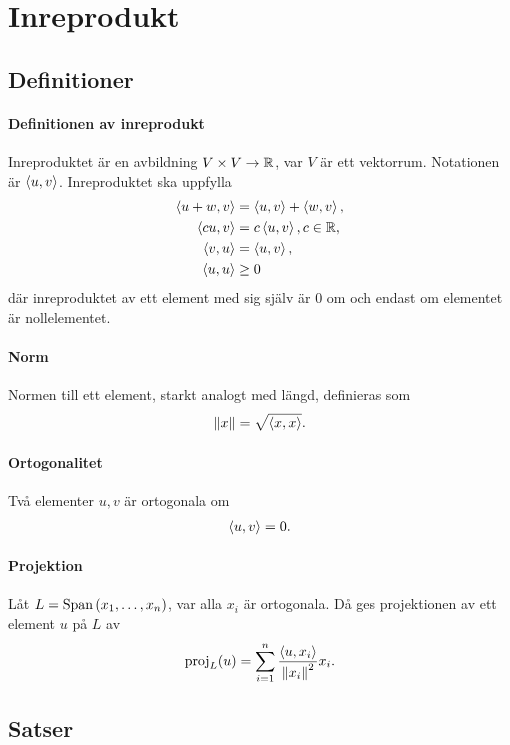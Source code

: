 \section{Inreprodukt}

\subsection{Definitioner}

\paragraph{Definitionen av inreprodukt}
Inreproduktet är en avbildning $V\times V\to\mathbb{R}$, var $V$ är ett vektorrum. Notationen är $\expval{u, v}$. Inreproduktet ska uppfylla
\begin{align*}
	\expval{u + w, v} &= \expval{u, v} + \expval{w, v}, \\
	\expval{cu, v}    &= c\expval{u, v}, c\in\mathbb{R}, \\
	\expval{v, u}     &= \expval{u, v}, \\
	\expval{u, u}     &\geq 0
\end{align*}
där inreproduktet av ett element med sig själv är $0$ om och endast om elementet är nollelementet.

\paragraph{Norm}
Normen till ett element, starkt analogt med längd, definieras som
\begin{align*}
	\norm{x} = \sqrt{\expval{x, x}}.
\end{align*}

\paragraph{Ortogonalitet}
Två elementer $u, v$ är ortogonala om
\begin{align*}
	\expval{u, v} = 0.
\end{align*}

\paragraph{Projektion}
Låt $L = \text{Span}\left(x_1, \dots, x_n\right)$, var alla $x_i$ är ortogonala. Då ges projektionen av ett element $u$ på $L$ av
\begin{align*}
	\text{proj}_{L}(u) = \sum\limits_{i = 1}^{n}\frac{\expval{u, x_i}}{\norm{x_i}^2}x_i.
\end{align*}

\subsection{Satser}